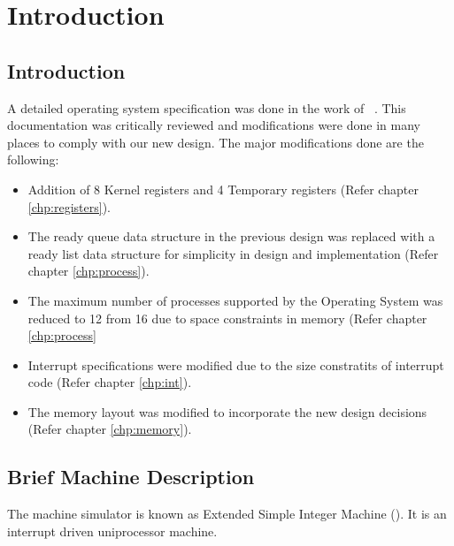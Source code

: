 \chapter{Introduction }
\label{chp:intro}

\section{Introduction}
A detailed operating system specification was done in the work of ~\cite{group2}. This documentation was critically reviewed and modifications were done in many places to comply with our new design.
The major modifications done are the following:
\begin{itemize}
\item Addition of 8 Kernel registers and 4 Temporary registers (Refer chapter \ref{chp:registers}).

\item The ready queue data structure in the previous design was replaced with a ready list data structure for simplicity in design and implementation (Refer chapter \ref{chp:process}).

\item The maximum number of processes supported by the Operating System was reduced to 12 from 16 due to space constraints in memory (Refer chapter \ref{chp:process}

\item Interrupt specifications were modified due to the size constratits of interrupt code (Refer chapter \ref{chp:int}).

\item The memory layout was modified to incorporate the new design decisions (Refer chapter \ref{chp:memory}).
\end{itemize}

\section{Brief Machine Description}
The machine simulator is known as Extended Simple Integer Machine (\ESIM).
It is an interrupt driven uniprocessor machine.

